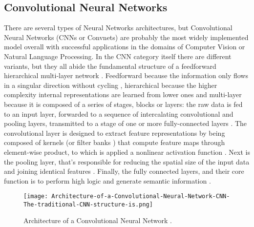 \documentclass[class=report, crop=false, a4paper, 12pt]{standalone}
\begin{document}
\subsection{Convolutional Neural Networks} %
There are several types of Neural Networks architectures, but Convolutional Neural Networks (CNNs or Convnets) are probably the most widely implemented model overall \autocite{yamashitaConvolutionalNeuralNetworks2018, liSurveyConvolutionalNeural2022} with successful applications in the domains of Computer Vision \autocite{krizhevskyImageNetClassificationDeep2012,taigmanDeepFaceClosingGap2014,tompsonEfficientObjectLocalization2015, zhangImprovedBreastCancer2021} or Natural Language Processing\autocite{abdel-hamidConvolutionalNeuralNetworks2014, wangGenCNNConvolutionalArchitecture2015, xiangConvolutionalNeuralNetworkbased2020}. In the CNN category itself there are different variants, but they all abide the fundamental structure of a feedforward hierarchical multi-layer network . Feedforward because the information only flows in a singular direction without cycling \autocite{zellSimulationNeuronalerNetze1994}, hierarchical because the higher complexity internal representations are learned from lower ones \autocite{lecunDeepLearning2015, zhuBCNNBranchConvolutional2017} and multi-layer because it is composed of a series of stages, blocks or layers: the raw data is fed to an input layer, forwarded to a sequence of intercalating convolutional and pooling layers, transmitted to a stage of one or more fully-connected layers \autocite{lecunDeepLearning2015, yamashitaConvolutionalNeuralNetworks2018, guRecentAdvancesConvolutional2018, alzubaidiReviewDeepLearning2021}. The convolutional layer is designed to extract feature representations by being composed of kernels (or filter banks \autocite{lecunDeepLearning2015}) that compute feature maps through element-wise product, to which is applied a nonlinear activation function \autocite{guRecentAdvancesConvolutional2018,yamashitaConvolutionalNeuralNetworks2018}. Next is the pooling layer, that's responsible for reducing the spatial size of the input data \autocite{guRecentAdvancesConvolutional2018} and joining identical features \autocite{lecunDeepLearning2015}. Finally, the fully connected layers, and their core function is to perform high logic and generate semantic information \autocite{guRecentAdvancesConvolutional2018}.

\begin{figure}[t!]
    \centering
    \texttt{[image: Architecture-of-a-Convolutional-Neural-Network-CNN-The-traditional-CNN-structure-is.png]}
    \caption{Architecture of a Convolutional Neural Network \autocite{kangDeepSimilarityMetric2019}.}
    \label{fig:cnn}
\end{figure}
\end{document}
